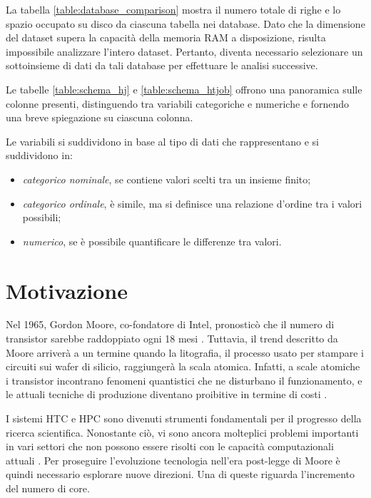 La tabella \ref{table:database_comparison} mostra il numero totale di righe e
lo spazio occupato su disco da ciascuna tabella nei database. Dato che la
dimensione del dataset supera la capacità della memoria RAM a disposizione,
risulta impossibile analizzare l'intero dataset. Pertanto, diventa necessario
selezionare un sottoinsieme di dati da tali database per effettuare le analisi
successive.

Le tabelle \ref{table:schema_hj} e \ref{table:schema_htjob} offrono una
panoramica sulle colonne presenti, distinguendo tra variabili categoriche e
numeriche e fornendo una breve spiegazione su ciascuna colonna. 

Le variabili si suddividono in base al tipo di dati che rappresentano e si
suddividono in: 

\begin{itemize}
    \item \textit{categorico nominale}, se contiene valori scelti tra un
        insieme finito;
    \item \textit{categorico ordinale}, è simile, ma si definisce una
        relazione d'ordine tra i valori possibili;
    \item \textit{numerico}, se è possibile quantificare le differenze tra valori.
\end{itemize}

\section{Motivazione}

Nel 1965, Gordon Moore, co-fondatore di Intel, pronosticò che il numero di
transistor sarebbe raddoppiato ogni 18 mesi \cite{Moore1965}. Tuttavia, il
trend descritto da Moore arriverà a un termine quando la litografia, il
processo usato per stampare i circuiti sui wafer di silicio, raggiungerà la
scala atomica. Infatti, a scale atomiche i transistor incontrano fenomeni
quantistici che ne disturbano il funzionamento, e le attuali tecniche di
produzione diventano proibitive in termine di costi \cite{Shalf2015,
Theis2017}.

I sistemi HTC e HPC sono divenuti strumenti fondamentali per il progresso
della ricerca scientifica. Nonostante ciò, vi sono ancora molteplici problemi
importanti in vari settori che non possono essere risolti con le capacità
computazionali attuali \cite{Villa2014}. Per proseguire l'evoluzione
tecnologia nell'era post-legge di Moore è quindi necessario esplorare nuove
direzioni. Una di queste riguarda l'incremento del numero di core.

